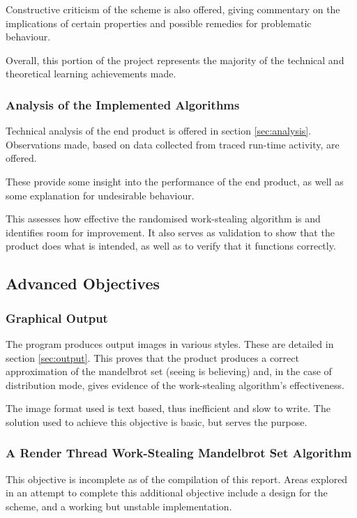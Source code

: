     Constructive criticism of the scheme is also offered, giving commentary on the implications of certain properties and possible
    remedies for problematic behaviour.
    
    Overall, this portion of the project represents the majority of the technical and theoretical learning achievements made.
    
\subsubsection*{Analysis of the Implemented Algorithms}
    Technical analysis of the end product is offered in section \ref{sec:analysis}.
    Observations made, based on data collected from traced run-time activity, are offered.
    
    These provide some insight into the performance of the end product, as well as some explanation for
    undesirable behaviour.

    This assesses how effective the randomised work-stealing algorithm is and identifies room for improvement.
    It also serves as validation to show that the product does what is intended, as well as to verify that it functions correctly.

\subsection{Advanced Objectives}
\subsubsection*{Graphical Output}
    The program produces output images in various styles. These are detailed in section \ref{sec:output}.
    This proves that the product produces a correct approximation of the mandelbrot set (seeing is believing) and, in the 
    case of distribution mode, gives evidence of the work-stealing algorithm's effectiveness. 
    
    The image format used is text based, thus inefficient and slow to write. The solution used to achieve this objective is basic, but serves 
    the purpose.
    
\subsubsection*{A Render Thread Work-Stealing Mandelbrot Set Algorithm}
    This objective is incomplete as of the compilation of this report. 
    Areas explored in an attempt to complete this additional objective include
    a design for the scheme, and a working but unstable implementation.
    
